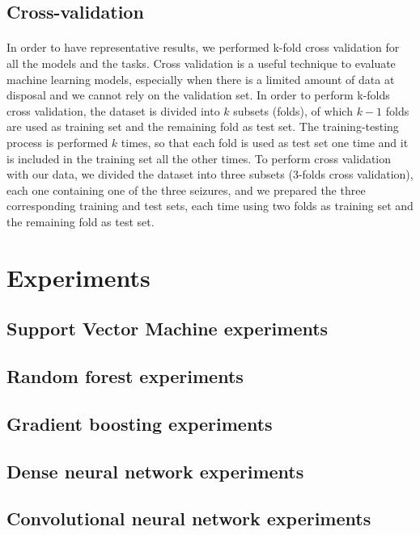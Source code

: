 \subsection{Cross-validation}
\paragraph{} In order to have representative results, we performed k-fold cross validation for all the models and the tasks. Cross validation is a useful technique to evaluate machine learning models, especially when there is a limited amount of data at disposal and we cannot rely on the validation set. In order to perform k-folds cross validation, the dataset is divided into $k$ subsets (folds), of which $k-1$ folds are used as training set and the remaining fold as test set. The training-testing process is performed $k$ times, so that each fold is used as test set one time and it is included in the training set all the other times. To perform cross validation with our data, we divided the dataset into three subsets (3-folds cross validation), each one containing one of the three seizures, and we prepared the three corresponding training and test sets, each time using two folds as training set and the remaining fold as test set.


\section{Experiments} \label{sec: experiments}

\subsection{Support Vector Machine experiments}
\subsection{Random forest experiments}
\subsection{Gradient boosting experiments}
\subsection{Dense neural network experiments}
\subsection{Convolutional neural network experiments}
